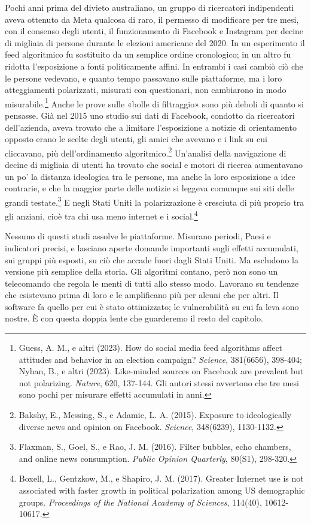 Pochi anni prima del divieto australiano, un gruppo di ricercatori indipendenti aveva ottenuto da Meta qualcosa di raro, il permesso di modificare per tre mesi, con il consenso degli utenti, il funzionamento di Facebook e Instagram per decine di migliaia di persone durante le elezioni americane del 2020. In un esperimento il feed algoritmico fu sostituito da un semplice ordine cronologico; in un altro fu ridotta l'esposizione a fonti politicamente affini. In entrambi i casi cambiò ciò che le persone vedevano, e quanto tempo passavano sulle piattaforme, ma i loro atteggiamenti polarizzati, misurati con questionari, non cambiarono in modo misurabile.\footnote{Guess, A. M., e altri (2023). How do social media feed algorithms affect attitudes and behavior in an election campaign? \textit{Science}, 381(6656), 398-404; Nyhan, B., e altri (2023). Like-minded sources on Facebook are prevalent but not polarizing. \textit{Nature}, 620, 137-144. Gli autori stessi avvertono che tre mesi sono pochi per misurare effetti accumulati in anni.} Anche le prove sulle «bolle di filtraggio» sono più deboli di quanto si pensasse. Già nel 2015 uno studio sui dati di Facebook, condotto da ricercatori dell'azienda, aveva trovato che a limitare l'esposizione a notizie di orientamento opposto erano le scelte degli utenti, gli amici che avevano e i link su cui cliccavano, più dell'ordinamento algoritmico.\footnote{Bakshy, E., Messing, S., e Adamic, L. A. (2015). Exposure to ideologically diverse news and opinion on Facebook. \textit{Science}, 348(6239), 1130-1132.} Un'analisi della navigazione di decine di migliaia di utenti ha trovato che social e motori di ricerca aumentavano un po' la distanza ideologica tra le persone, ma anche la loro esposizione a idee contrarie, e che la maggior parte delle notizie si leggeva comunque sui siti delle grandi testate.\footnote{Flaxman, S., Goel, S., e Rao, J. M. (2016). Filter bubbles, echo chambers, and online news consumption. \textit{Public Opinion Quarterly}, 80(S1), 298-320.} E negli Stati Uniti la polarizzazione è cresciuta di più proprio tra gli anziani, cioè tra chi usa meno internet e i social.\footnote{Boxell, L., Gentzkow, M., e Shapiro, J. M. (2017). Greater Internet use is not associated with faster growth in political polarization among US demographic groups. \textit{Proceedings of the National Academy of Sciences}, 114(40), 10612-10617.}

Nessuno di questi studi assolve le piattaforme. Misurano periodi, Paesi e indicatori precisi, e lasciano aperte domande importanti sugli effetti accumulati, sui gruppi più esposti, su ciò che accade fuori dagli Stati Uniti. Ma escludono la versione più semplice della storia. Gli algoritmi contano, però non sono un telecomando che regola le menti di tutti allo stesso modo. Lavorano su tendenze che esistevano prima di loro e le amplificano più per alcuni che per altri. Il software fa quello per cui è stato ottimizzato; le vulnerabilità su cui fa leva sono nostre. È con questa doppia lente che guarderemo il resto del capitolo.

